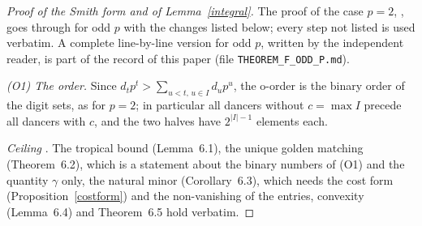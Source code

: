 \documentclass[10pt]{article}
\theoremstyle{ds}
\theoremstyle{dsrem}
\begin{document}
\begin{proof}[Proof of the Smith form and of Lemma~\ref{integral}]
The proof of the case $p=2$, \cite[\S6--\S7]{DST}, goes through for odd $p$ with the changes listed below; every step not listed is used verbatim. A complete line-by-line version for odd $p$, written by the independent reader, is part of the record of this paper (file \texttt{THEOREM\_F\_ODD\_P.md}).

\emph{(O1) The order.} Since $d_tp^t>\sum_{u<t,\,u\in I}d_up^u$, the o-order is the binary order of the digit sets, as for $p=2$; in particular all dancers without $c=\max I$ precede all dancers with $c$, and the two halves have $2^{|I|-1}$ elements each.

\emph{Ceiling} \cite[\S6]{DST}. The tropical bound (Lemma~6.1), the unique golden matching (Theorem~6.2), which is a statement about the binary numbers of (O1) and the quantity $\gamma$ only, the natural minor (Corollary~6.3), which needs the cost form (Proposition~\ref{costform}) and the non-vanishing of the entries, convexity (Lemma~6.4) and Theorem~6.5 hold verbatim.


\end{proof}
\end{document}
